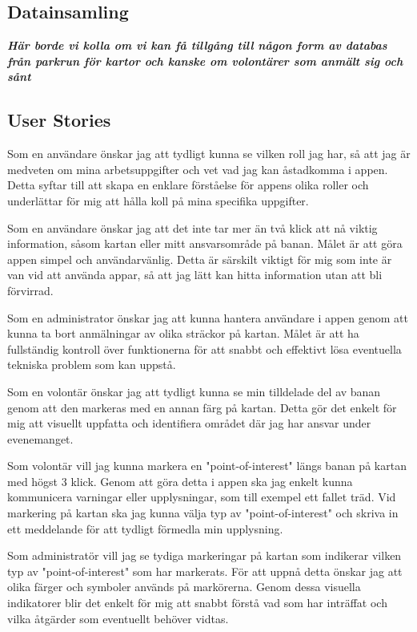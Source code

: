 \subsection{Datainsamling}

\textbf{\textit{Här borde vi kolla om vi kan få tillgång till någon form av databas från parkrun för kartor och kanske om volontärer som anmält sig och sånt}}

\subsection{User Stories}

Som en användare önskar jag att tydligt kunna se vilken roll jag har, så att jag är medveten om mina arbetsuppgifter och vet vad jag kan åstadkomma i appen. Detta syftar till att skapa en enklare förståelse för appens olika roller och underlättar för mig att hålla koll på mina specifika uppgifter.

\vspace{1em}
Som en användare önskar jag att det inte tar mer än två klick att nå viktig information, såsom kartan eller mitt ansvarsområde på banan. Målet är att göra appen simpel och användarvänlig. Detta är särskilt viktigt för mig som inte är van vid att använda appar, så att jag lätt kan hitta information utan att bli förvirrad.

\vspace{1em}
Som en administrator önskar jag att kunna hantera användare i appen genom att kunna ta bort anmälningar av olika sträckor på kartan. Målet är att ha fullständig kontroll över funktionerna för att snabbt och effektivt lösa eventuella tekniska problem som kan uppstå.

\vspace{1em}
Som en volontär önskar jag att tydligt kunna se min tilldelade del av banan genom att den markeras med en annan färg på kartan. Detta gör det enkelt för mig att visuellt uppfatta och identifiera området där jag har ansvar under evenemanget.

\vspace{1em}

Som volontär vill jag kunna markera en "point-of-interest" längs banan på kartan med högst 3 klick. Genom att göra detta i appen ska jag enkelt kunna kommunicera varningar eller upplysningar, som till exempel ett fallet träd. Vid markering på kartan ska jag kunna välja typ av "point-of-interest" och skriva in ett meddelande för att tydligt förmedla min upplysning.
\vspace{1em}

Som administratör vill jag se tydiga markeringar på kartan som indikerar vilken typ av "point-of-interest" som har markerats. För att uppnå detta önskar jag att olika färger och symboler används på markörerna. Genom dessa visuella indikatorer blir det enkelt för mig att snabbt förstå vad som har inträffat och vilka åtgärder som eventuellt behöver vidtas.



